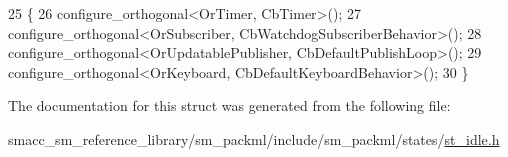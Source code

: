 \begin{DoxyCode}
25     \{
26         configure\_orthogonal<OrTimer, CbTimer>();   
27         configure\_orthogonal<OrSubscriber, CbWatchdogSubscriberBehavior>();
28         configure\_orthogonal<OrUpdatablePublisher, CbDefaultPublishLoop>();
29         configure\_orthogonal<OrKeyboard, CbDefaultKeyboardBehavior>();
30     \}
\end{DoxyCode}


The documentation for this struct was generated from the following file\+:\begin{DoxyCompactItemize}
\item 
smacc\+\_\+sm\+\_\+reference\+\_\+library/sm\+\_\+packml/include/sm\+\_\+packml/states/\hyperlink{st__idle_8h}{st\+\_\+idle.\+h}\end{DoxyCompactItemize}
